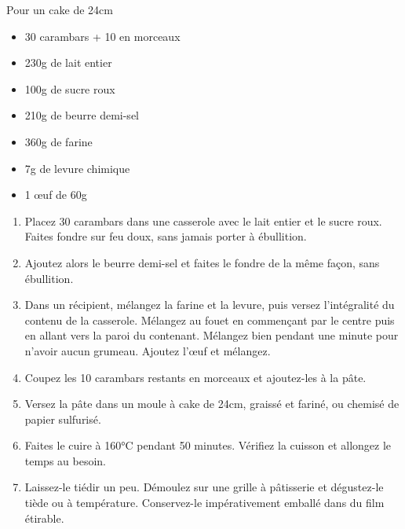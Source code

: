 \bigskip
{}
{Pour un cake de 24cm}{\begin{itemize}
	\item 30 carambars + 10 en morceaux
	\item 230g de lait entier
	\item 100g de sucre roux
	\item 210g de beurre demi-sel
	\item 360g de farine
	\item 7g de levure chimique
	\item 1 œuf de 60g
\end{itemize}}
{\begin{enumerate}
	\item Placez  30 carambars dans une casserole avec le lait entier et le sucre roux. Faites fondre sur feu doux, sans jamais porter à ébullition.
	\item Ajoutez alors le beurre demi-sel et faites le fondre de la même façon, sans ébullition.
	\item Dans un récipient, mélangez la farine et la levure, puis versez l'intégralité du contenu de la casserole. Mélangez au fouet en commençant par le centre puis en allant vers la paroi du contenant. Mélangez bien pendant une minute pour n'avoir aucun grumeau. Ajoutez l'œuf et mélangez.
	\item Coupez les 10 carambars restants en morceaux et ajoutez-les à la pâte.
	\item Versez la pâte dans un moule à cake de 24cm, graissé et fariné, ou chemisé de papier sulfurisé.
	\item Faites le cuire à 160°C pendant 50 minutes. Vérifiez la cuisson et allongez le temps au besoin.
	\item Laissez-le tiédir un peu. Démoulez sur une grille à pâtisserie et dégustez-le tiède ou à température. Conservez-le impérativement emballé dans du film étirable. 
\end{enumerate}
}

